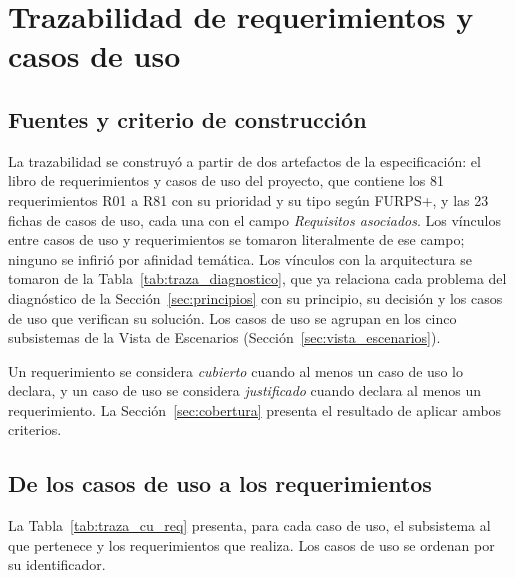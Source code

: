 \documentclass[11pt,a4paper]{article}
\DeclareRobustCommand{\_}{\textunderscore\allowbreak}
\begin{document}
\section{Trazabilidad de requerimientos y casos de uso}
\label{sec:trazabilidad}

\subsection{Fuentes y criterio de construcción}

La trazabilidad se construyó a partir de dos artefactos de la especificación: el libro de requerimientos y casos de uso del proyecto, que contiene los 81 requerimientos R01 a R81 con su prioridad y su tipo según FURPS+, y las 23 fichas de casos de uso, cada una con el campo \textit{Requisitos asociados}. Los vínculos entre casos de uso y requerimientos se tomaron literalmente de ese campo; ninguno se infirió por afinidad temática. Los vínculos con la arquitectura se tomaron de la Tabla~\ref{tab:traza_diagnostico}, que ya relaciona cada problema del diagnóstico de la Sección~\ref{sec:principios} con su principio, su decisión y los casos de uso que verifican su solución. Los casos de uso se agrupan en los cinco subsistemas de la Vista de Escenarios (Sección~\ref{sec:vista_escenarios}).

Un requerimiento se considera \textit{cubierto} cuando al menos un caso de uso lo declara, y un caso de uso se considera \textit{justificado} cuando declara al menos un requerimiento. La Sección~\ref{sec:cobertura} presenta el resultado de aplicar ambos criterios.


\subsection{De los casos de uso a los requerimientos}
\label{sec:traza_cu_req}

La Tabla~\ref{tab:traza_cu_req} presenta, para cada caso de uso, el subsistema al que pertenece y los requerimientos que realiza. Los casos de uso se ordenan por su identificador.
\end{document}
